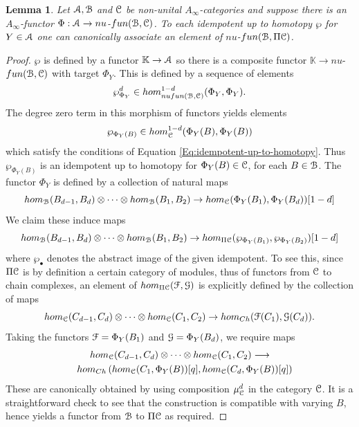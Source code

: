 \documentclass[reqno,10pt]{amsart}
\numberwithin{equation}{section}
\newcommand{\bK}{{\mathbb K}}
\newcommand{\scrC}{\EuScript{C}}
\newcommand{\scrG}{\EuScript{G}}
\newcommand{\scrF}{\EuScript{F}}
\newcommand{\scrA}{\EuScript{A}}
\newcommand{\scrB}{\EuScript{B}}
\newtheorem{Lemma}[thm]{Lemma}
\theoremstyle{remark}
\begin{document}
\begin{Lemma} \label{Lem:SplitIdempotentFunctors}
Let $\scrA, \scrB$ and $\scrC$ be non-unital $A_{\infty}$-categories and suppose there is an $A_{\infty}$-functor $\Phi: \scrA \rightarrow nu$-$fun(\scrB,\scrC)$. To each idempotent up to homotopy $\wp$ for $Y\in\scrA$ one can canonically associate an element of $nu$-$fun(\scrB,\Pi\scrC)$.
\end{Lemma}

\begin{proof}
$\wp$ is defined by a functor $\bK \rightarrow \scrA$ so there is a composite functor $\bK \rightarrow nu$-$fun(\scrB,\scrC)$ with target $\Phi_Y$.  This is defined by a sequence of elements
\[
\wp_{\Phi_Y}^d \in hom_{nufun(\scrB,\scrC)}^{1-d}(\Phi_Y,\Phi_Y).
\]
The degree zero term in this morphism of functors yields elements
\[
\wp_{\Phi_Y(B)} \in hom_{\scrC}^{1-d}(\Phi_Y(B),\Phi_Y(B))
\]
which satisfy the conditions of Equation \ref{Eq:idempotent-up-to-homotopy}.  Thus $\wp_{\Phi_Y(B)}$ is an idempotent up to homotopy for $\Phi_Y(B) \in \scrC$, for each $B \in \scrB$.  The functor $\Phi_Y$ is defined by a collection of natural maps
\[
hom_{\scrB}(B_{d-1},B_d) \otimes \cdots \otimes hom_{\scrB}(B_1,B_2) \rightarrow hom_{\scrC}(\Phi_Y(B_1), \Phi_Y(B_d))[1-d]
\]
We claim these induce maps
\[
hom_{\scrB}(B_{d-1},B_d) \otimes \cdots \otimes hom_{\scrB}(B_1,B_2) \rightarrow hom_{\Pi\scrC}(\wp_{\Phi_Y(B_1)}, \wp_{\Phi_Y(B_2)})[1-d]
\]
where $\wp_{\bullet}$ denotes the abstract image of the given idempotent.  To see this, since $\Pi\scrC$ is by definition a certain category of modules, thus of functors from $\scrC$ to chain complexes, an element of $hom_{\Pi\scrC}(\scrF,\scrG)$ is explicitly defined by the collection of maps
\[
hom_{\scrC}(C_{d-1},C_d) \otimes \cdots \otimes hom_{\scrC}(C_1,C_2) \rightarrow hom_{Ch}(\scrF(C_1), \scrG(C_d)).
\]
Taking the functors $\scrF = \Phi_Y(B_1)$ and $\scrG=\Phi_Y(B_d)$, we require maps
\begin{multline*}
hom_{\scrC}(C_{d-1},C_d) \otimes \cdots \otimes hom_{\scrC}(C_1,C_2) \longrightarrow  \\ \quad hom_{Ch}\left(hom_{\scrC}(C_1,\Phi_Y(B))[q], hom_{\scrC}(C_d,\Phi_Y(B))[q] \right) \end{multline*}
These are canonically obtained by using composition $\mu^d_{\scrC}$ in the category $\scrC$.  It is a straightforward check to see that the construction is compatible with varying $B$, hence  yields a functor from $\scrB$ to $\Pi\scrC$ as required.
\end{proof}
\end{document}
